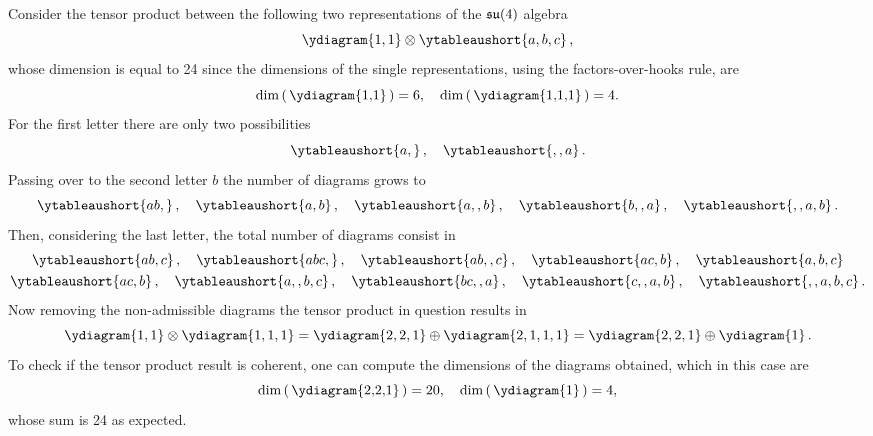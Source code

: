 \begin{ex}
    Consider the tensor product between the following two representations of the $\mathfrak{su}(4)$ algebra
    \begin{equation}
        \ydiagram{1,1} \ot \ytableaushort{a,b,c}\,,
    \end{equation}
    whose dimension is equal to 24 since the dimensions of the single representations, using the factors-over-hooks rule, are
    \begin{equation}
        \dim\left(\,\vcenter{\hbox{\ydiagram{1,1}}}\,\right) = 6,\quad \dim\left(\,\vcenter{\hbox{\ydiagram{1,1,1}}}\,\right) = 4.
    \end{equation}
    For the first letter there are only two possibilities
    \begin{equation}
        \ytableaushort{{}a,{}}\,,\quad \ytableaushort{{},{},a}\,.
    \end{equation}
    Passing over to the second letter $b$ the number of diagrams grows to
    \begin{equation}
        \ytableaushort{{}ab,{}}\,,\quad \ytableaushort{{}a,{}b}\,,\quad \ytableaushort{{}a,{},b}\,,\quad \ytableaushort{{}b,{},a}\,,\quad \ytableaushort{{},{},a,b}\,.
    \end{equation}
    Then, considering the last letter, the total number of diagrams consist in
    \begin{gather}
        \ytableaushort{{}ab,{}c}\,,\quad \ytableaushort{{}abc,{}}\,,\quad \ytableaushort{{}ab,{},c}\,,\quad \ytableaushort{{}ac,{}b}\,,\quad \ytableaushort{{}a,{}b,c} \\
        \ytableaushort{{}ac,{}b}\,,\quad \ytableaushort{{}a,{},b,c}\,,\quad \ytableaushort{{}bc,{},a}\,,\quad \ytableaushort{{}c,{},a,b}\,,\quad \ytableaushort{{},{},a,b,c}\,.
    \end{gather}
    Now removing the non-admissible diagrams the tensor product in question results in 
    \begin{equation}
        \ydiagram{1,1} \ot \ydiagram{1,1,1} = \ydiagram{2,2,1} \op \ydiagram{2,1,1,1} = \ydiagram{2,2,1} \op \ydiagram{1}\,.
    \end{equation}
    To check if the tensor product result is coherent, one can compute the dimensions of the diagrams obtained, which in this case are
    \begin{equation}
        \dim\left(\,\vcenter{\hbox{\ydiagram{2,2,1}}}\,\right) = 20,\quad \dim\left(\,\vcenter{\hbox{\ydiagram{1}}}\,\right) = 4,
    \end{equation}
    whose sum is 24 as expected.
\end{ex}

